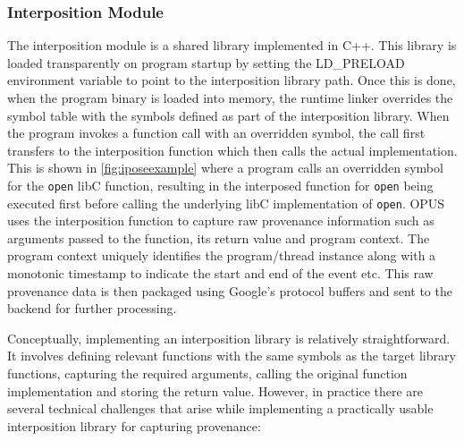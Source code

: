 \documentclass[withindex,glossary]{cam-thesis}
\begin{document}
\subsubsection{Interposition Module}
The interposition module is a shared library implemented in C++.
This library is loaded transparently on program startup by setting the LD\_PRELOAD environment variable to point to the interposition library path.
Once this is done, when the program binary is loaded into memory, the runtime linker overrides the symbol table with the symbols defined as part of the interposition library.
When the program invokes a function call with an overridden symbol, the call first transfers to the interposition function which then calls the actual implementation. 
This is shown in \ref{fig:iposeexample} where a program calls an overridden symbol for the \texttt{open} libC function, resulting in the interposed function for \texttt{open} being executed first before calling the underlying libC implementation of \texttt{open}.
OPUS uses the interposition function to capture raw provenance information such as arguments passed to the function, its return value and program context.
The program context uniquely identifies the program/thread instance along with a monotonic timestamp to indicate the start and end of the event etc.
This raw provenance data is then packaged using Google's protocol buffers and sent to the backend for further processing.

Conceptually, implementing an interposition library is relatively straightforward.
It involves defining relevant functions with the same symbols as the target library functions, capturing the required arguments, calling the original function implementation and storing the return value.
However, in practice there are several technical challenges that arise while implementing a practically usable interposition library for capturing provenance:
\end{document}
